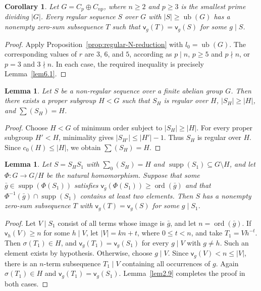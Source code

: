 \documentclass[10pt,a4paper]{amsart}
\newtheorem{cor}[thm]{Corollary}
\newtheorem{lem}[thm]{Lemma}
\theoremstyle{definition}
\theoremstyle{remark}
\numberwithin{equation}{section}
\DeclareMathOperator{\ord}{ord}
\DeclareMathOperator{\supp}{supp}
\begin{document}
\begin{cor}\label{cor:regular-main}
Let $G=C_p\oplus C_{np}$, where $n\ge2$ and $p\ge3$ is the
smallest prime dividing $|G|$. Every regular sequence $S$ over $G$
with $|S|\ge \operatorname{ub}(G)$ has a nonempty zero-sum subsequence $T$ such that
$\mathsf v_g(T)=\mathsf v_g(S)$ for some $g\mid S$.
\end{cor}
\begin{proof}
Apply Proposition~\ref{prop:regular-N-reduction} with $l_0=\operatorname{ub}(G)$.
The corresponding values of $r$ are $3$, $6$, and $5$,
according as $p\mid n$, $p\ge5$ and $p\nmid n$, or
$p=3$ and $3\nmid n$.
In each case, the required inequality is precisely
Lemma~\ref{lem6.1}.
\end{proof}

\begin{lem}\label{lem:4.0}
Let $S$ be a non-regular sequence over a finite abelian group $G$.
Then there exists a proper subgroup $H<G$ such that $S_H$
is regular over $H$, $|S_H|\ge|H|$, and $\sum(S_H)=H$.
\end{lem}

\begin{proof}
Choose $H<G$ of minimum order subject to $|S_H|\ge|H|$.
For every proper subgroup $H'<H$, minimality gives
$|S_{H'}|\le|H'|-1$. Thus $S_H$ is regular over $H$.
Since $c_0(H)\le|H|$, we obtain $\sum(S_H)=H$.
\end{proof}

\begin{lem}\label{lem:N-heavy-fiber}
Let $S=S_HS_1$ with $\sum_0(S_H)=H$ and
$\supp(S_1)\subseteq G\setminus H$, and let $\Phi:G\to G/H$
be the natural homomorphism.
Suppose that some $\bar g\in\supp(\Phi(S_1))$ satisfies
$\mathsf v_{\bar g}(\Phi(S_1))\ge\ord(\bar g)$ and that
$\Phi^{-1}(\bar g)\cap\supp(S_1)$ contains at least two elements.
Then $S$ has a nonempty zero-sum subsequence $T$ with
$\mathsf v_g(T)=\mathsf v_g(S)$ for some $g\mid S_1$.
\end{lem}

\begin{proof}
Let $V\mid S_1$ consist of all terms whose image is $\bar g$,
and let $n=\ord(\bar g)$.
If $\mathsf v_h(V)\ge n$ for some $h\mid V$, let $|V|=kn+t$,
where $0\le t<n$, and take $T_1=Vh^{-t}$.
Then $\sigma(T_1)\in H$, and
$\mathsf v_g(T_1)=\mathsf v_g(S_1)$ for every $g\mid V$ with $g\ne h$.
Such an element exists by hypothesis.
Otherwise, choose $g\mid V$. Since $\mathsf v_g(V)<n\le|V|$,
there is an $n$-term subsequence $T_1\mid V$ containing all occurrences
of $g$. Again $\sigma(T_1)\in H$ and
$\mathsf v_g(T_1)=\mathsf v_g(S_1)$.
Lemma~\ref{lem2.9} completes the proof in both cases.
\end{proof}
\end{document}
